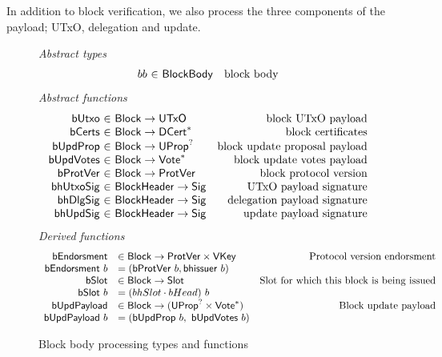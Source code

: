 \documentclass[11pt,a4paper]{article}
\newcommand{\fun}[1]{\mathsf{#1}}
\newcommand{\type}[1]{\mathsf{#1}}
\newcommand{\seqof}[1]{#1^{*}}
\newcommand{\totalf}{\to}
\newcommand{\Slot}{\type{Slot}}
\newcommand{\Block}{\type{Block}}
\newcommand{\DCert}{\type{DCert}}
\newcommand{\VKey}{\type{VKey}}
\newcommand{\Sig}{\type{Sig}}
\newcommand{\bcertsname}{bCerts}
\newcommand{\bhissuername}{bhissuer}
\newcommand{\bhissuer}[1]{\fun{\bhissuername} ~ #1}
\begin{document}
In addition to block verification, we also process the three components of the
payload; UTxO, delegation and update.

\begin{figure}[ht]
  \emph{Abstract types}
  \begin{equation*}
    \begin{array}{r@{~\in~}lr}
      bb & \Bbody & \text{block body} \\

    \end{array}
  \end{equation*}
  \emph{Abstract functions}
  \begin{equation*}
    \begin{array}{r@{~\in~}lr}
      \fun{bUtxo} & \Block \totalf \UTxO & \text{block UTxO payload} \\
      \fun{\bcertsname} & \Block \totalf \seqof{\DCert}
                                         & \text{block certificates} \\
      \fun{bUpdProp} & \Block \totalf \UProp^{?} & \text{block update proposal payload} \\
      \fun{bUpdVotes} & \Block \totalf \seqof{\Vote} & \text{block update votes payload} \\
      \fun{bProtVer} & \Block \totalf \ProtVer & \text{block protocol version} \\
      \fun{bhUtxoSig} & \Bhead \totalf \Sig & \text{UTxO payload signature} \\
      \fun{bhDlgSig} & \Bhead \totalf \Sig & \text{delegation payload signature} \\
      \fun{bhUpdSig} & \Bhead \totalf \Sig & \text{update payload signature} \\
    \end{array}
  \end{equation*}
  \emph{Derived functions}
  \begin{equation*}
    \begin{array}{rlr}
      \fun{bEndorsment} & \in \Block \to \ProtVer \times \VKey & \text{Protocol version endorsment} \\
      \bendorsment{b} & = (\bprotver{b}, \bhissuer{b}) \\
      \fun{\bslotname} & \in \Block \to \Slot & \text{Slot for which this block is being issued} \\
      \bslot{b} & = (\bhslotname \cdot \bheadname)~b \\
      \fun{\bupdpayloadname} & \in \Block \to (\UProp^{?}\times\seqof{\Vote}) & \text{Block update payload} \\
      \bupdpayload{b} & = (\bupdprop{b},~\bupdvotes{b})
    \end{array}
  \end{equation*}
  \caption{Block body processing types and functions}
  \label{fig:defs:bbody}
\end{figure}
\end{document}
